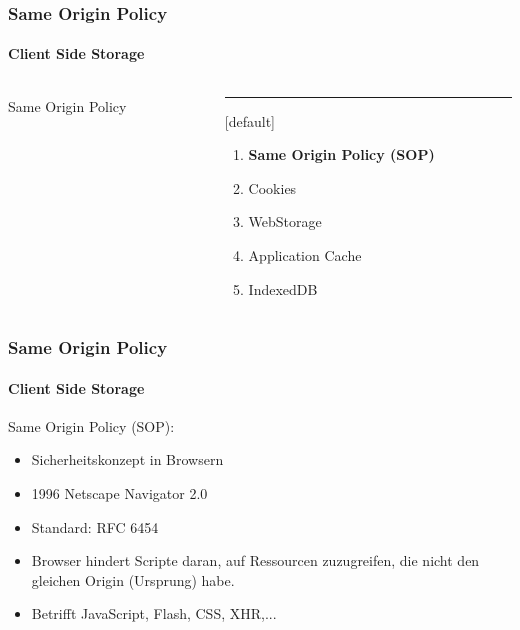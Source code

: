 \begin{frame}
\frametitle{Same Origin Policy}
\framesubtitle{Client Side Storage}
\begin{columns}[T] %
\begin{column}{.48\textwidth}

\begin{center}
{\Huge Same Origin Policy}
\end{center}

\end{column}%
\hfill%
\begin{column}{.48\textwidth}
\color{blue}\rule{\linewidth}{4pt}

	[default]
	\begin{enumerate}
		\item \textbf{Same Origin Policy (SOP)}
		\item Cookies
		\item WebStorage
		\item Application Cache
		\item IndexedDB
	\end{enumerate}
\end{column}%
\end{columns}
\end{frame}
\begin{frame}
\frametitle{Same Origin Policy}
\framesubtitle{Client Side Storage}

	Same Origin Policy (SOP):
	\begin{itemize}
		\item <1> Sicherheitskonzept in Browsern
		\item <1> 1996 Netscape Navigator 2.0
		\item <1> Standard: RFC 6454
		\item <1> Browser hindert Scripte daran, auf Ressourcen zuzugreifen, die nicht den gleichen Origin (Ursprung) habe. 
		\item <1> Betrifft JavaScript, Flash, CSS, XHR,...
	\end{itemize}

\end{frame}

